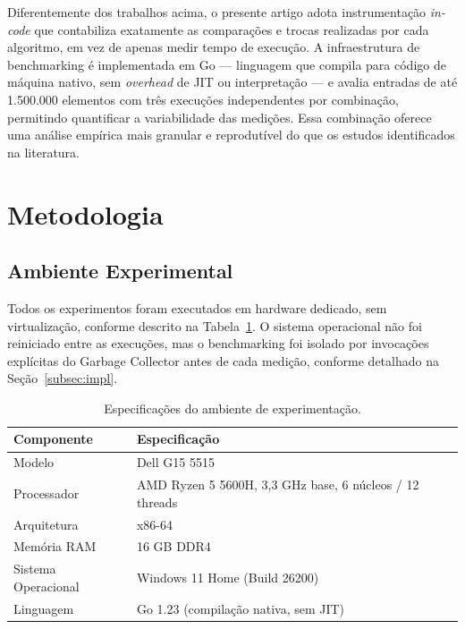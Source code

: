 \documentclass[12pt]{article}
\begin{document}
Diferentemente dos trabalhos acima, o presente artigo
adota instrumentação \textit{in-code} que contabiliza
exatamente as comparações e trocas realizadas por cada
algoritmo, em vez de apenas medir tempo de execução. A
infraestrutura de benchmarking é implementada em Go —
linguagem que compila para código de máquina nativo, sem
\textit{overhead} de JIT ou interpretação — e avalia
entradas de até 1.500.000 elementos com três execuções
independentes por combinação, permitindo quantificar
a variabilidade das medições. Essa combinação oferece
uma análise empírica mais granular e reprodutível do que
os estudos identificados na literatura.

\section{Metodologia}
\label{sec:method}

\subsection{Ambiente Experimental}

Todos os experimentos foram executados em hardware dedicado,
sem virtualização, conforme descrito na Tabela~\ref{tab:hardware}.
O sistema operacional não foi reiniciado entre as execuções,
mas o benchmarking foi isolado por invocações explícitas do
Garbage Collector antes de cada medição, conforme detalhado
na Seção~\ref{subsec:impl}.

\begin{table}[ht]
\centering
\caption{Especificações do ambiente de experimentação.}
\label{tab:hardware}
\begin{tabular}{ll}
\toprule
\textbf{Componente} & \textbf{Especificação} \\
\midrule
Modelo              & Dell G15 5515 \\
Processador         & AMD Ryzen 5 5600H, 3,3 GHz base, 6 núcleos / 12 threads \\
Arquitetura         & x86-64 \\
Memória RAM         & 16 GB DDR4 \\
Sistema Operacional & Windows 11 Home (Build 26200) \\
Linguagem           & Go 1.23 (compilação nativa, sem JIT) \\
\bottomrule
\end{tabular}
\end{table}
\end{document}
